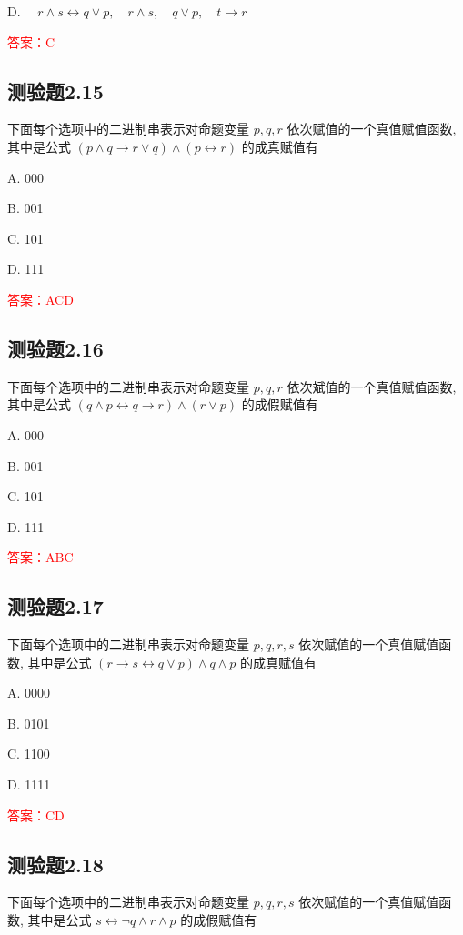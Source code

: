\documentclass[UTF8, heading=true]{ctexart}
\begin{document}
D. $\quad r \wedge s \leftrightarrow q \vee p, \quad r \wedge s, \quad q \vee p, \quad t \rightarrow r$


\textcolor{red}{答案：C}

\subsection{测验题2.15}

下面每个选项中的二进制串表示对命题变量 $p, q, r$ 依次赋值的一个真值赋值函数, 其中是公式 $(p \wedge q \rightarrow r \vee q) \wedge(p \leftrightarrow r)$ 的成真赋值有 $\qquad$

A. 000

B. 001

C. 101

D. 111

\textcolor{red}{答案：ACD}


\subsection{测验题2.16}

下面每个选项中的二进制串表示对命题变量 $p, q, r$ 依次斌值的一个真值赋值函数, 其中是公式 $(q \wedge p \leftrightarrow q \rightarrow r) \wedge(r \vee p)$ 的成假赋值有 $\qquad$

A. 000

B. 001

C. 101

D. 111

\textcolor{red}{答案：ABC}

\subsection{测验题2.17}

下面每个选项中的二进制串表示对命题变量 $p, q, r, s$ 依次赋值的一个真值赋值函数, 其中是公式 $(r \rightarrow s \leftrightarrow q \vee p) \wedge q \wedge p$ 的成真赋值有 $\qquad$

A. 0000

B. 0101

C. 1100

D. 1111

\textcolor{red}{答案：CD}

\subsection{测验题2.18}

下面每个选项中的二进制串表示对命题变量 $p, q, r, s$ 依次赋值的一个真值赋值函数, 其中是公式 $s \leftrightarrow \neg q \wedge r \wedge p$ 的成假赋值有 $\qquad$
\end{document}

